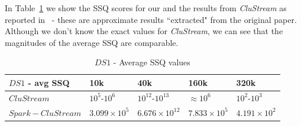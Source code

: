 In Table~\ref{tab:DS1quality} we show the SSQ scores for our \our and the results from \emph{CluStream} as reported in~\cite{CluStream} - these are approximate results ``extracted" from the original paper.
Although we don't know the exact values for \emph{CluStream}, we can see that the magnitudes of the average SSQ are comparable.

\begin{table}[t]
\centering
  \begin{tabular}{|l|l|l|l|l|}\hline
\textbf{$DS1$ - avg SSQ} & \textbf{10k} & \textbf{40k} & \textbf{160k} & \textbf{320k}\\\hline
$CluStream$ & $10^5$-$10^6$ & $10^{12}$-$10^{13}$ & $\approx 10^6$ & $10^2$-$10^3$\\\hline
$Spark-CluStream$ & $3.099\times10^5$ & $6.676\times10^{12}$ & $7.833\times10^5$ & $4.191\times10^2$\\\hline
  \end{tabular}
  \caption{$DS1$ - Average SSQ values}
  \label{tab:DS1quality}
\end{table}


